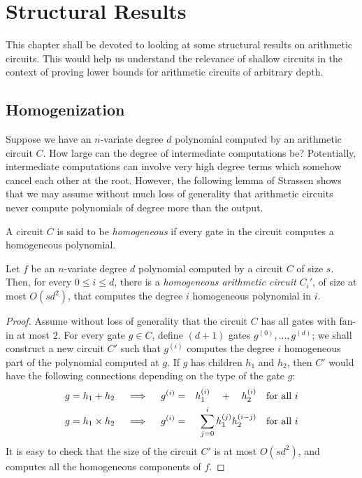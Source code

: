 \chapter{Structural Results}\label{chap:structural-results}


This chapter shall be devoted to looking at some structural results on arithmetic circuits. This would help us understand the relevance of shallow circuits in the context of proving lower bounds for arithmetic circuits of arbitrary depth. 

\section{Homogenization}\label{sec:homogenization}

Suppose we have an $n$-variate degree $d$ polynomial computed by an arithmetic circuit $C$. How large can the degree of intermediate computations be? Potentially, intermediate computations can involve very high degree terms which somehow cancel each other at the root. However, the following lemma of Strassen shows that we may assume without much loss of generality that arithmetic circuits never compute polynomials of degree more than the output. 

\begin{definition}
A circuit $C$ is said to be \emph{homogeneous} if every gate in the circuit computes a homogeneous polynomial. 
\end{definition}

\begin{lemma}[Homogenization]
Let $f$ be an $n$-variate degree $d$ polynomial computed by a circuit $C$ of size $s$. Then, for every $0\leq i \leq d$, there is a \emph{homogeneous arithmetic circuit} $C_i'$, of size at most $O(sd^2)$, that computes the degree $i$ homogeneous polynomial in $i$. 
\end{lemma}
\begin{proof}
Assume without loss of generality that the circuit $C$ has all gates with fan-in at most $2$. 
For every gate $g\in C$, define $(d+1)$ gates $g^{(0)},\dots, g^{(d)}$; we shall construct a new circuit $C'$ such that $g^{(i)}$ computes the degree $i$ homogeneous part of the polynomial computed at $g$. If $g$ has children $h_1$ and $h_2$, then $C'$ would have the following connections depending on the type of the gate $g$:
\begin{eqnarray*}
\text{$g = h_1 + h_2$}\quad\implies\quad g^{(i)} &=& h_1^{(i)} \quad + \quad h_2^{(i)}\quad\text{for all $i$}\\
\text{$g = h_1 \times h_2$}\quad\implies\quad g^{(i)} &=& \sum_{j=0}^i h_1^{(j)} h_2^{(i-j)}\quad\text{for all $i$}
\end{eqnarray*}
It is easy to check that the size of the circuit $C'$ is at most $O(sd^2)$, and computes all the homogeneous components of $f$. 
\end{proof}

